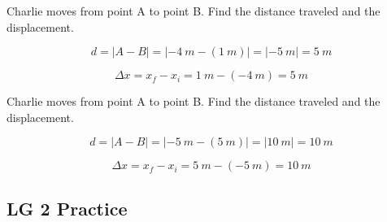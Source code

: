 \documentclass[]{exam}
\begin{document}
\begin{questions}
\question
Charlie moves from point A to point B. Find the distance traveled and the displacement.


\begin{solution}
\begin{equation*}
    d = \left|A - B\right| = \left|\SI{-4}{m} - (\SI{1}{m})\right| = \left|\SI{-5}{m}\right| = \boxed{\SI{5}{m}}
\end{equation*}

\begin{equation*}
    \Delta x = x_f - x_i = \SI{1}{m} - (\SI{-4}{m}) = \boxed{\SI{5}{m}}
\end{equation*}
\end{solution}

\question
Charlie moves from point A to point B. Find the distance traveled and the displacement.


\begin{solution}
\begin{equation*}
    d = \left|A - B\right| = \left|\SI{-5}{m} - (\SI{5}{m})\right| = \left|\SI{10}{m}\right| = \boxed{\SI{10}{m}}
\end{equation*}

\begin{equation*}
    \Delta x = x_f - x_i = \SI{5}{m} - (\SI{-5}{m}) = \boxed{\SI{10}{m}}
\end{equation*}
\end{solution}

\end{questions}

\clearpage



\subsection*{LG 2 Practice}
\end{document}
